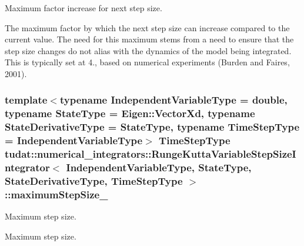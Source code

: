 Maximum factor increase for next step size. 

The maximum factor by which the next step size can increase compared to the current value. The need for this maximum stems from a need to ensure that the step size changes do not alias with the dynamics of the model being integrated. This is typically set at 4., based on numerical experiments (Burden and Faires, 2001). 
\subsubsection[{\texorpdfstring{maximum\+Step\+Size\+\_\+}{maximumStepSize_}}]{\setlength{\rightskip}{0pt plus 5cm}template$<$typename Independent\+Variable\+Type  = double, typename State\+Type  = Eigen\+::\+Vector\+Xd, typename State\+Derivative\+Type  = State\+Type, typename Time\+Step\+Type  = Independent\+Variable\+Type$>$ Time\+Step\+Type {\bf tudat\+::numerical\+\_\+integrators\+::\+Runge\+Kutta\+Variable\+Step\+Size\+Integrator}$<$ Independent\+Variable\+Type, State\+Type, State\+Derivative\+Type, Time\+Step\+Type $>$\+::maximum\+Step\+Size\+\_\+\hspace{0.3cm}{\ttfamily [protected]}}\hypertarget{classtudat_1_1numerical__integrators_1_1RungeKuttaVariableStepSizeIntegrator_ac8bdeabe449addaf3dd481396dc71481}{}\label{classtudat_1_1numerical__integrators_1_1RungeKuttaVariableStepSizeIntegrator_ac8bdeabe449addaf3dd481396dc71481}


Maximum step size. 

Maximum step size. 
